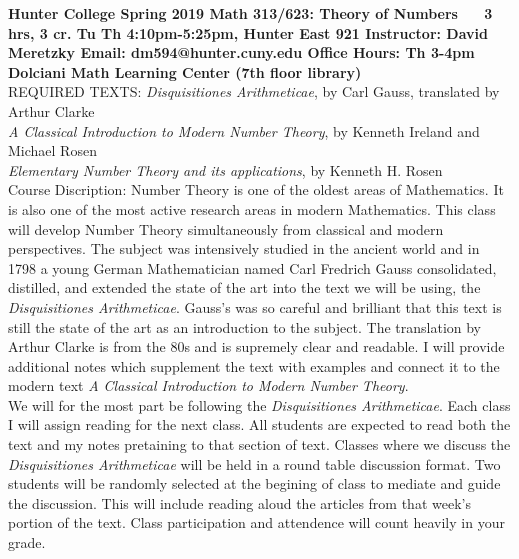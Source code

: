 \documentclass{article}
\begin{document}
	{\bfseries Hunter College
		\newline Spring 2019
		\newline Math 313/623: Theory of Numbers $\;\;\;\;$ 3 hrs, 3 cr. 
		\newline Tu Th 4:10pm-5:25pm, Hunter East 921
		\newline Instructor: David Meretzky
		\newline Email: dm594@hunter.cuny.edu
		\newline Office Hours: Th 3-4pm Dolciani Math Learning Center (7th floor library)
		}\\
	
	REQUIRED TEXTS: \textit{Disquisitiones Arithmeticae}, by Carl Gauss, translated by Arthur Clarke\\
     \textit{A Classical Introduction to Modern Number Theory}, by Kenneth Ireland and Michael Rosen\\
     \textit{Elementary Number Theory and its applications}, by Kenneth H. Rosen\\
	
	Course Discription: Number Theory is one of the oldest areas of Mathematics. It is also one of the most active research areas in modern Mathematics. This class will develop Number Theory simultaneously from classical and modern perspectives. The subject was intensively studied in the ancient world and in 1798 a young German Mathematician named Carl Fredrich Gauss consolidated, distilled, and extended the state of the art into the text we will be using, the \textit{Disquisitiones Arithmeticae}. Gauss's was so careful and brilliant that this text is still the state of the art as an introduction to the subject. The translation by Arthur Clarke is from the 80s and is supremely clear and readable. I will provide additional notes which supplement the text with examples and connect it to the modern text \textit{A Classical Introduction to Modern Number Theory}. \\
	
	We will for the most part be following the \textit{Disquisitiones Arithmeticae}. Each class I will assign reading for the next class. All students are expected to read both the text and my notes pretaining to that section of text. Classes where we discuss the \textit{Disquisitiones Arithmeticae} will be held in a round table discussion format. Two students will be randomly selected at the begining of class to mediate and guide the discussion. This will include reading aloud the articles from that week's portion of the text. Class participation and attendence will count heavily in your grade. 
	
\end{document}
